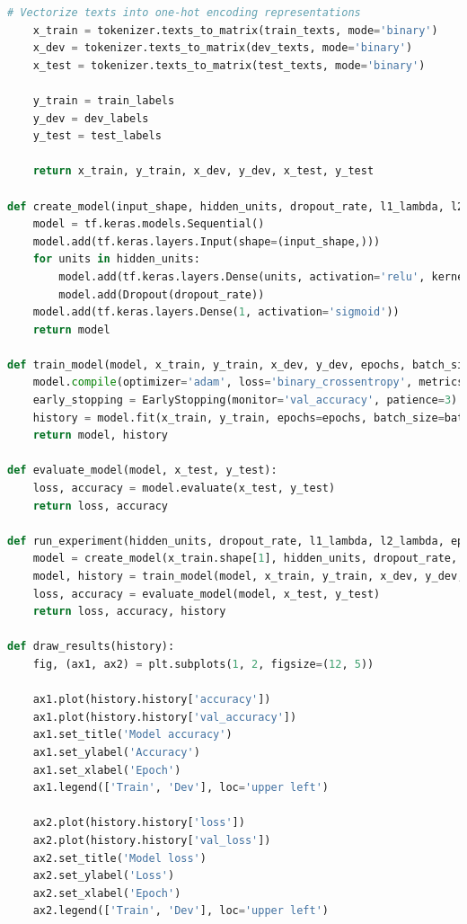 \documentclass{report}
\begin{document}
\begin{lstlisting}[language=Python, caption=Implementación final del perceptron]
    # Vectorize texts into one-hot encoding representations
    x_train = tokenizer.texts_to_matrix(train_texts, mode='binary')
    x_dev = tokenizer.texts_to_matrix(dev_texts, mode='binary')
    x_test = tokenizer.texts_to_matrix(test_texts, mode='binary')

    y_train = train_labels
    y_dev = dev_labels
    y_test = test_labels
    
    return x_train, y_train, x_dev, y_dev, x_test, y_test

def create_model(input_shape, hidden_units, dropout_rate, l1_lambda, l2_lambda):
    model = tf.keras.models.Sequential()
    model.add(tf.keras.layers.Input(shape=(input_shape,)))
    for units in hidden_units:
        model.add(tf.keras.layers.Dense(units, activation='relu', kernel_regularizer=regularizers.l1_l2(l1=l1_lambda, l2=l2_lambda)))
        model.add(Dropout(dropout_rate))
    model.add(tf.keras.layers.Dense(1, activation='sigmoid'))
    return model

def train_model(model, x_train, y_train, x_dev, y_dev, epochs, batch_size):
    model.compile(optimizer='adam', loss='binary_crossentropy', metrics=['accuracy'])
    early_stopping = EarlyStopping(monitor='val_accuracy', patience=3)
    history = model.fit(x_train, y_train, epochs=epochs, batch_size=batch_size, validation_data=(x_dev, y_dev), callbacks=[early_stopping])
    return model, history

def evaluate_model(model, x_test, y_test):
    loss, accuracy = model.evaluate(x_test, y_test)
    return loss, accuracy

def run_experiment(hidden_units, dropout_rate, l1_lambda, l2_lambda, epochs, batch_size):
    model = create_model(x_train.shape[1], hidden_units, dropout_rate, l1_lambda, l2_lambda)
    model, history = train_model(model, x_train, y_train, x_dev, y_dev, epochs, batch_size)
    loss, accuracy = evaluate_model(model, x_test, y_test)
    return loss, accuracy, history

def draw_results(history):
    fig, (ax1, ax2) = plt.subplots(1, 2, figsize=(12, 5))
    
    ax1.plot(history.history['accuracy'])
    ax1.plot(history.history['val_accuracy'])
    ax1.set_title('Model accuracy')
    ax1.set_ylabel('Accuracy')
    ax1.set_xlabel('Epoch')
    ax1.legend(['Train', 'Dev'], loc='upper left')
    
    ax2.plot(history.history['loss'])
    ax2.plot(history.history['val_loss'])
    ax2.set_title('Model loss')
    ax2.set_ylabel('Loss')
    ax2.set_xlabel('Epoch')
    ax2.legend(['Train', 'Dev'], loc='upper left')
    

\end{lstlisting}
\end{document}
